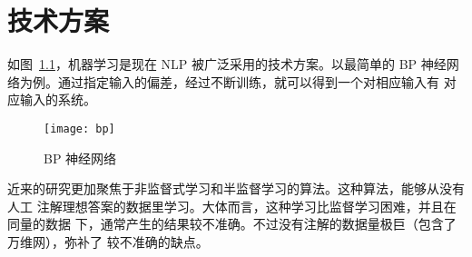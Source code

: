 \documentclass[../main]{subfiles}
\begin{document}
\chapter{技术方案}%
\label{cha:method}

如图~\ref{fig:bp}，机器学习是现在 NLP 被广泛采用的技术方案。以最简单的 BP
神经网络为例。通过指定输入的偏差，经过不断训练，就可以得到一个对相应输入有
对应输入的系统。

\begin{figure}[htbp]
  \centering
  \texttt{[image: bp]}
  \caption{BP 神经网络}%
  \label{fig:bp}
\end{figure}

近来的研究更加聚焦于非监督式学习和半监督学习的算法。这种算法，能够从没有人工
注解理想答案的数据里学习。大体而言，这种学习比监督学习困难，并且在同量的数据
下，通常产生的结果较不准确。不过没有注解的数据量极巨（包含了万维网），弥补了
较不准确的缺点。
\end{document}
